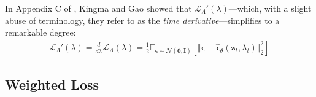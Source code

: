 \documentclass[ oneside,%
                    author={George Herbert},
                    degree={MSci},
                     title={Video Diffusion Models for Climate Simulations},
                  subtitle={}]{dissertation}
\begin{document}
In Appendix C of \cite{Understanding_Diffusion_Objective_Kingma}, Kingma and Gao showed that $\mathcal{L}_\Lambda'(\lambda)$---which, with a slight abuse of terminology, they refer to as the \textit{time derivative}---simplifies to a remarkable degree:
\begin{align}
      \mathcal{L}_{\Lambda}'(\lambda)=\frac{d}{d\lambda}\mathcal{L}_\Lambda(\lambda)=\frac{1}{2}\mathbb{E}_{\boldsymbol\epsilon\sim\mathcal{N}(\mathbf{0}, \mathbf{I})}\left[\Vert \boldsymbol\epsilon -\hat{\boldsymbol\epsilon}_\theta(\mathbf{z}_t,\lambda_t)\Vert_2^2\right]\label{eq:time_derivative}
\end{align} 

\subsection{Weighted Loss}
\label{sec:background_diffusion_weighted_loss}
\end{document}
